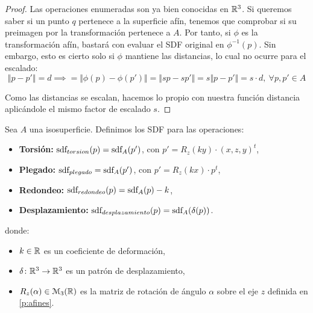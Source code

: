\begin{proof}
    Las operaciones enumeradas son ya bien conocidas en $\mathbb{R}^3$. Si queremos saber si un punto $q$ pertenece a la superficie afín, tenemos que comprobar si su preimagen por la transformación pertenece a $A$. Por tanto, si $\phi$ es la transformación afín, bastará con evaluar el SDF original en $\phi^{-1}(p)$. Sin embargo, esto es cierto solo si $\phi$ mantiene las distancias, lo cual no ocurre para el escalado: 
    \begin{equation*}
        \Vert p-p'\Vert = d \implies = \Vert \phi(p)-\phi(p')\Vert = \Vert sp-sp'\Vert = s\Vert p-p'\Vert = s\cdot d,\ \forall p,p' \in A
    \end{equation*}

    Como las distancias se escalan, hacemos lo propio con nuestra función distancia aplicándole el mismo factor de escalado $s$.
\end{proof}

\begin{proposicion}
    Sea $A$ una isosuperficie. Definimos los SDF para las operaciones:
    \begin{itemize}
        
        \item \textbf{Torsión: } $\text{sdf}_{torsion}(p) = \text{sdf}_{A}(p')$, con $p' = R_z(ky)\cdot (x,z,y)^t$,
        \item \textbf{Plegado: } $\text{sdf}_{plegado} =\text{sdf}_{A}(p')$, con $p' = R_z(kx)\cdot p^t$,
        \item \textbf{Redondeo: } $\text{sdf}_{redondeo}(p) = \text{sdf}_{A}(p) - k$,
        \item \textbf{Desplazamiento: } $\text{sdf}_{desplazamiento}(p) = \text{sdf}_{A}(\delta(p))$.
    \end{itemize}

    donde:
    \begin{itemize}
        \item $k\in \mathbb{R}$ es un coeficiente de deformación,
        \item $\delta\colon \mathbb{R}^3\to \mathbb{R}^3$ es un patrón de desplazamiento,
        \item $R_z(\alpha)\in \mathcal{M}_3(\mathbb{R})$ es la matriz de rotación de ángulo $\alpha$ sobre el eje $z$ definida en \autoref{p:afines}.
    \end{itemize}
\end{proposicion}

